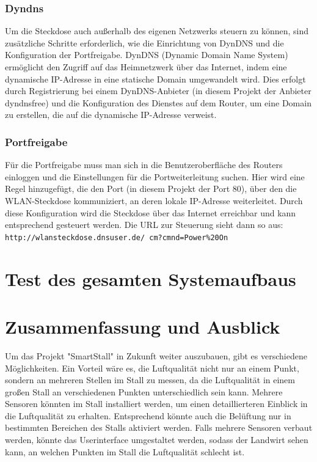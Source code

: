 \documentclass[conference]{IEEEtran}
\begin{document}
\subsubsection{Dyndns}
Um die Steckdose auch außerhalb des eigenen Netzwerks steuern zu können, sind zusätzliche Schritte erforderlich, wie die Einrichtung von DynDNS und die Konfiguration der Portfreigabe. DynDNS (Dynamic Domain Name System) ermöglicht den Zugriff auf das Heimnetzwerk über das Internet, indem eine dynamische IP-Adresse in eine statische Domain umgewandelt wird. Dies erfolgt durch Registrierung bei einem DynDNS-Anbieter (in diesem Projekt der Anbieter dyndnsfree) und die Konfiguration des Dienstes auf dem Router, um eine Domain zu erstellen, die auf die dynamische IP-Adresse verweist.
\subsubsection{Portfreigabe}
Für die Portfreigabe muss man sich in die Benutzeroberfläche des Routers einloggen und die Einstellungen für die Portweiterleitung suchen. Hier wird eine Regel hinzugefügt, die den Port (in diesem Projekt der Port 80), über den die WLAN-Steckdose kommuniziert, an deren lokale IP-Adresse weiterleitet. Durch diese Konfiguration wird die Steckdose über das Internet erreichbar und kann entsprechend gesteuert werden. Die URL zur Steuerung sieht dann so aus: \texttt{http://wlansteckdose.dnsuser.de/
cm?cmnd=Power\%20On}


\section{Test des gesamten Systemaufbaus}

\section{Zusammenfassung und Ausblick}
Um das Projekt "SmartStall" in Zukunft weiter auszubauen, gibt es verschiedene Möglichkeiten. Ein Vorteil wäre es, die Luftqualität nicht nur an einem Punkt, sondern an mehreren Stellen im Stall zu messen, da die Luftqualität in einem großen Stall an verschiedenen Punkten unterschiedlich sein kann. Mehrere Sensoren könnten im Stall installiert werden, um einen detaillierteren Einblick in die Luftqualität zu erhalten. Entsprechend könnte auch die Belüftung nur in bestimmten Bereichen des Stalls aktiviert werden. Falls mehrere Sensoren verbaut werden, könnte das Userinterface umgestaltet werden, sodass der Landwirt sehen kann, an welchen Punkten im Stall die Luftqualität schlecht ist.
\end{document}

